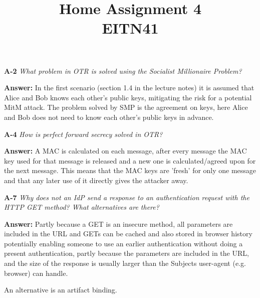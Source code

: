 \documentclass[a4paper]{article}
\title{Home Assignment 4 \\ EITN41}
\author{}
\date{}
\newcommand{\Q}[2]{ \vspace{10pt} \textbf{A-#1} \textit{#2} }
\newcommand{\A}[1]{ \textbf{Answer:} #1 }
\begin{document}
\maketitle

\Q{2} { %
    What problem in OTR is solved using the Socialist Millionaire Problem?
}

\A{
    In the first scenario (section 1.4 in the lecture notes)
    it is assumed that Alice and Bob knows each other's public keys,
    mitigating the risk for a potential MitM attack.
    The problem solved by SMP is the agreement on keys,
    here Alice and Bob does not need to know each other's public keys
    in advance.



}

\Q{4} {
    How is perfect forward secrecy solved in OTR?
}

\A{
    A MAC is calculated on each message, after every message the MAC key used 
    for that message is released and a new one is calculated/agreed upon
    for the next message. This means that the MAC keys are 'fresh' for only
    one message and that any later use of it directly gives
    the attacker away.
}

\Q{7} {
    Why does not an IdP send a response to an authentication request with the 
    HTTP GET method? What alternatives are there?
}

\A{    %
    Partly because a GET is an insecure method, all parameters are 
    included in the URL and GETs can be cached and also stored in 
    browser history
    potentially enabling someone to use an earlier authentication
    without doing a present authentication,
    partly because the parameters are included in the URL, 
    and the size of the response is usually larger
    than the Subjects user-agent (e.g. browser)
    can handle.

    An alternative is an artifact binding.
}
\end{document}
